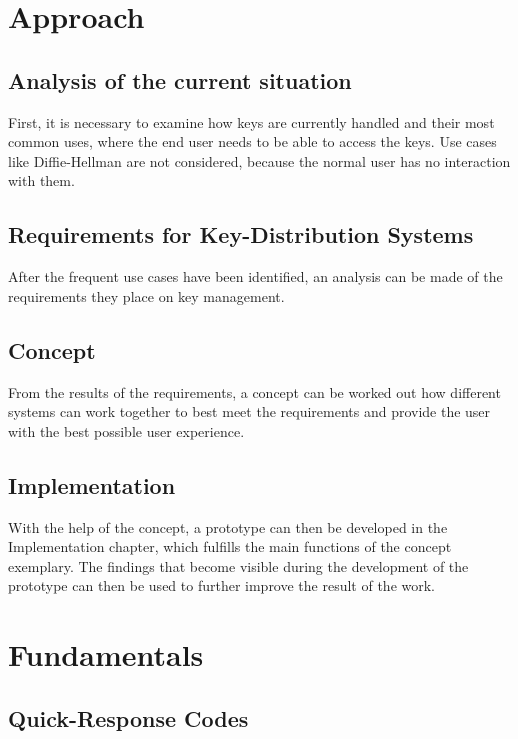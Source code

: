 \documentclass[12pt,oneside,a4paper,parskip]{scrbook}
\begin{document}
\chapter{Approach}

\section{Analysis of the current situation}

First, it is necessary to examine how keys are currently handled and their most common uses, where the end user needs to be able to access the keys. Use cases like Diffie-Hellman are not considered, because the normal user has no interaction with them.

\section{Requirements for Key-Distribution Systems}

After the frequent use cases have been identified, an analysis can be made of the requirements they place on key management. 

\section{Concept}

From the results of the requirements, a concept can be worked out how different systems can work together to best meet the requirements and provide the user with the best possible user experience. 

\section{Implementation}

With the help of the concept, a prototype can then be developed in the Implementation chapter, which fulfills the main functions of the concept exemplary. The findings that become visible during the development of the prototype can then be used to further improve the result of the work.

\chapter{Fundamentals}

\section{Quick-Response Codes}
\end{document}

